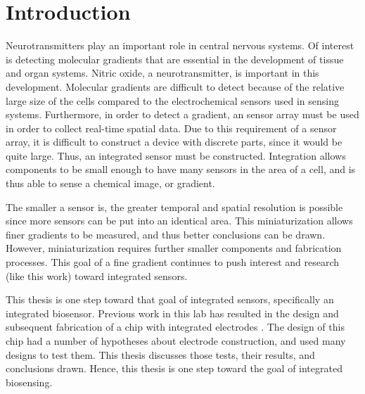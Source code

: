\chapter{Introduction}

Neurotransmitters play an important role in central nervous systems. Of interest is detecting molecular gradients that are essential in the development of tissue and organ systems. Nitric oxide, a neurotransmitter, is important in this development. Molecular gradients are difficult to detect because of the relative large size of the cells compared to the electrochemical sensors used in sensing systems. Furthermore, in order to detect a gradient, an sensor array must be used in order to collect real-time spatial data. Due to this requirement of a sensor array, it is difficult to construct a device with discrete parts, since it would be quite large. Thus, an integrated sensor must be constructed. Integration allows components to be small enough to have many sensors in the area of a cell, and is thus able to sense a chemical image, or gradient.

The smaller a sensor is, the greater temporal and spatial resolution is possible since more sensors can be put into an identical area. This miniaturization allows finer gradients to be measured, and thus better conclusions can be drawn. However, miniaturization requires further smaller components and fabrication processes. This goal of a fine gradient continues to push interest and research (like this work) toward integrated sensors.

This thesis is one step toward that goal of integrated sensors, specifically an integrated biosensor. Previous work in this lab has resulted in the design and subsequent fabrication of a chip with integrated electrodes \cite{karegar2007ema}. The design of this chip had a number of hypotheses about electrode construction, and used many designs to test them. This thesis discusses those tests, their results, and conclusions drawn. Hence, this thesis is one step toward the goal of integrated biosensing.
